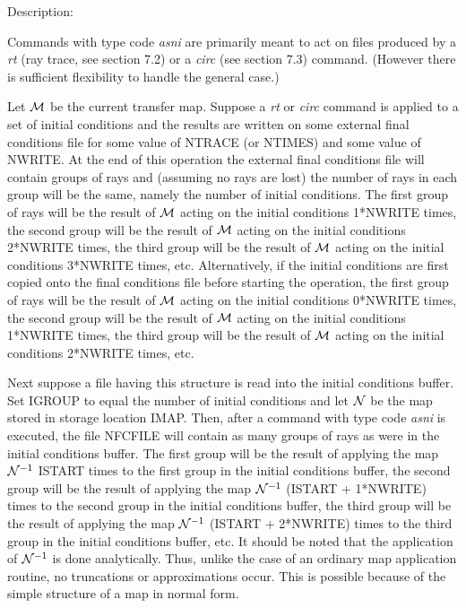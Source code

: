 \vspace{5mm}
     Description:
\vspace{2mm}

Commands with type code {\em asni} are primarily meant to act on files produced by a {\em rt} (ray trace, see section 7.2) or a {\em circ} (see section 7.3) command.  (However there is sufficient flexibility to handle the general case.)

Let ${\cal M}$ be the current transfer map.  Suppose a {\em rt} or {\em circ} command is applied to a set of initial conditions and the results are written on some external final conditions file for some value of NTRACE (or NTIMES) and some value of NWRITE. At the end of this operation the external final conditions file will contain groups of rays and (assuming no rays are lost) the number of rays in each group will be the same, namely the number of initial conditions.  The first group of rays will be the result of ${\cal M}$ acting on the initial conditions 1*NWRITE times, the second group will be the result of ${\cal M}$ acting on the initial conditions 2*NWRITE times, the third group will be the result of ${\cal M}$ acting on the initial conditions 3*NWRITE times, etc.  Alternatively, if the initial conditions are first copied onto the final conditions file before starting the operation, the first group of rays will be the result of ${\cal M}$ acting on the initial conditions 0*NWRITE times, the second group will be the result of ${\cal M}$ acting on the initial conditions 1*NWRITE times, the third group will be the result of ${\cal M}$ acting on the initial conditions 2*NWRITE times, etc.

Next suppose a file having this structure is read into the initial conditions buffer.  Set IGROUP to equal the number of initial conditions and let ${\cal N}$ be the map stored in storage location IMAP.  Then, after a command with type code {\em asni} is executed, the file NFCFILE will contain as many groups of rays as were in the initial conditions buffer.  The first group will be the result of applying the map ${\cal N}^{-1}$ ISTART times to the first group in the initial conditions buffer, the second group will be the result of applying the map ${\cal N}^{-1}$ (ISTART + 1*NWRITE) times to the second group in the initial conditions buffer, the third group will be the result of applying the map ${\cal N}^{-1}$ (ISTART + 2*NWRITE) times to the third group in the initial conditions buffer, etc.  It should be noted that the application of ${\cal N}^{-1}$ is done analytically.  Thus, unlike the case of an ordinary map application routine, no truncations or approximations occur.  This is possible because of the simple structure of a map in normal form.

